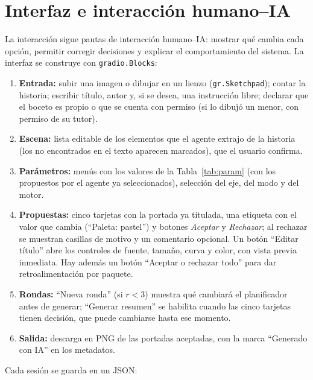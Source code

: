 \documentclass[10pt,a4paper,twocolumn]{article}
\begin{document}
\section{Interfaz e interacción humano--IA}
La interacción sigue pautas de interacción humano--IA: mostrar qué cambia cada opción, permitir corregir decisiones y explicar el comportamiento del sistema. La interfaz se construye con \texttt{gradio.Blocks}:
\begin{enumerate}
\item \textbf{Entrada:} subir una imagen o dibujar en un lienzo (\texttt{gr.Sketchpad}); contar la historia; escribir título, autor y, si se desea, una instrucción libre; declarar que el boceto es propio o que se cuenta con permiso (si lo dibujó un menor, con permiso de su tutor).
\item \textbf{Escena:} lista editable de los elementos que el agente extrajo de la historia (los no encontrados en el texto aparecen marcados), que el usuario confirma.
\item \textbf{Parámetros:} menús con los valores de la Tabla~\ref{tab:param} (con los propuestos por el agente ya seleccionados), selección del eje, del modo y del motor.
\item \textbf{Propuestas:} cinco tarjetas con la portada ya titulada, una etiqueta con el valor que cambia (``Paleta: pastel'') y botones \emph{Aceptar} y \emph{Rechazar}; al rechazar se muestran casillas de motivo y un comentario opcional. Un botón ``Editar título'' abre los controles de fuente, tamaño, curva y color, con vista previa inmediata. Hay además un botón ``Aceptar o rechazar todo'' para dar retroalimentación por paquete.
\item \textbf{Rondas:} ``Nueva ronda'' (si $r<3$) muestra qué cambiará el planificador antes de generar; ``Generar resumen'' se habilita cuando las cinco tarjetas tienen decisión, que puede cambiarse hasta ese momento.
\item \textbf{Salida:} descarga en PNG de las portadas aceptadas, con la marca ``Generado con IA'' en los metadatos.
\end{enumerate}
Cada sesión se guarda en un JSON:
\end{document}
